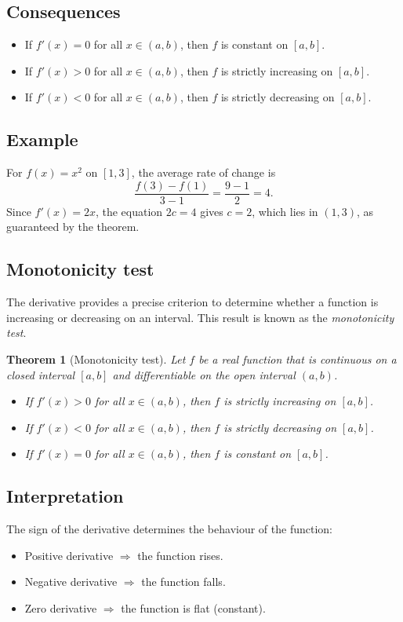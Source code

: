 \documentclass[11pt,a4paper]{article}
\theoremstyle{definition} \newtheorem{definition}{Definition} \theoremstyle{plain} \newtheorem{theorem}{Theorem}
\begin{document}
\subsection*{Consequences}
\begin{itemize}
\item If $f'(x)=0$ for all $x\in(a,b)$, then $f$ is constant on $[a,b]$.
\item If $f'(x)>0$ for all $x\in(a,b)$, then $f$ is strictly increasing on $[a,b]$.
\item If $f'(x)<0$ for all $x\in(a,b)$, then $f$ is strictly decreasing on $[a,b]$. \end{itemize}
\subsection*{Example}
For $f(x)=x^2$ on $[1,3]$, the average rate of change is
\[ \frac{f(3)-f(1)}{3-1} = \frac{9-1}{2} = 4. \]
Since $f'(x)=2x$, the equation $2c=4$ gives $c=2$, which lies in $(1,3)$, as guaranteed by the theorem.
\subsection{Monotonicity test}
The derivative provides a precise criterion to determine whether a function is increasing or decreasing on an interval.
This result is known as the \emph{monotonicity test}.
\begin{theorem}[Monotonicity test]\label{thm:monotonicity-test} Let $f$ be a real function that is continuous on a closed interval $[a,b]$ and differentiable on the open interval $(a,b)$. \begin{itemize}
\item If $f'(x) > 0$ for all $x \in (a,b)$, then $f$ is strictly increasing on $[a,b]$.
\item If $f'(x) < 0$ for all $x \in (a,b)$, then $f$ is strictly decreasing on $[a,b]$.
\item If $f'(x) = 0$ for all $x \in (a,b)$, then $f$ is constant on $[a,b]$. \end{itemize} \end{theorem}
\subsection*{Interpretation}
The sign of the derivative determines the behaviour of the function: \begin{itemize}
\item Positive derivative $\Rightarrow$ the function rises.
\item Negative derivative $\Rightarrow$ the function falls.
\item Zero derivative $\Rightarrow$ the function is flat (constant). \end{itemize}
\end{document}
